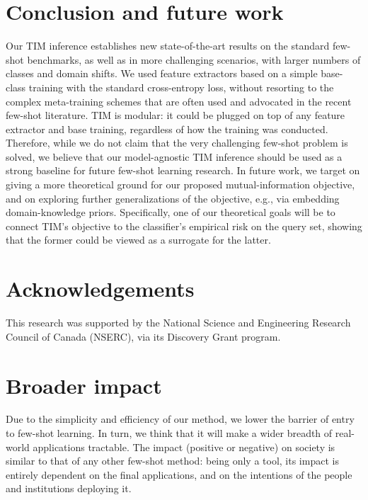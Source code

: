 \documentclass{article}
\begin{document}
 
\section{Conclusion and future work}

Our TIM inference establishes new state-of-the-art results on the standard few-shot benchmarks, as well as in more challenging scenarios, with larger numbers of classes and domain shifts. We used feature extractors based on a simple base-class training with the standard cross-entropy loss, without resorting to the complex meta-training schemes that are often used and advocated in the recent few-shot literature. TIM is modular: it could be plugged on top of any feature extractor and base training, regardless of how the training was conducted. Therefore, while we do not claim that the very challenging few-shot problem is solved, we believe that our model-agnostic TIM inference should be used as a strong baseline for future few-shot learning research. In future work, we target on giving a more theoretical ground for our proposed mutual-information objective, and on exploring further generalizations of the objective, e.g., via embedding domain-knowledge priors. Specifically, one of our theoretical goals will be to connect TIM's objective to the classifier's empirical risk on the query set, showing that the former could be viewed as a surrogate for the latter.

\section{Acknowledgements}
This research was supported by the National Science and Engineering Research Council of Canada (NSERC), via its Discovery Grant program.


 
 \section*{Broader impact}

    Due to the simplicity and efficiency of our method, we lower the barrier of entry to few-shot learning. In turn, we think that it will make a wider breadth of real-world applications tractable. The impact (positive or negative) on society is similar to that of any other few-shot method: being only a tool, its impact is entirely dependent on the final applications, and on the intentions of the people and institutions deploying it.
    
\end{document}

